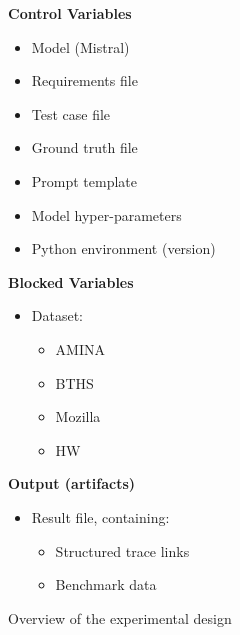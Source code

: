 \documentclass[conference]{IEEEtran}
\begin{document}
\begin{figure}[h]
\begin{center}
\begin{tcbraster}[raster columns=2, raster column skip=5pt, raster equal height=rows, raster row skip=5pt]
\begin{roundedBox}
            \centering 
            \textbf{Control Variables}
            \begin{itemize}
                \item Model (Mistral)
                \item Requirements file
                \item Test case file
                \item Ground truth file
                \item Prompt template
                \item Model hyper-parameters
                \item Python environment (version)
            \end{itemize}
        \end{roundedBox}
        \begin{roundedBox}
            \centering
            \textbf{Blocked Variables}
            \begin{itemize}
                \item Dataset:
                \begin{itemize}
                    \item AMINA
                    \item BTHS
                    \item Mozilla
                    \item HW
                \end{itemize}
            \end{itemize}
        \end{roundedBox}
        \begin{roundedBox}
            \centering
            \textbf{Output (artifacts)}
            \begin{itemize}
                \item Result file, containing:
                \begin{itemize}
                    \item Structured trace links
                    \item Benchmark data
                \end{itemize}
            \end{itemize}
        \end{roundedBox}       
        \end{tcbraster}
    \caption{Overview of the experimental design}
    \label{fig:exp-design}
\end{center}
\end{figure}
\end{document}
